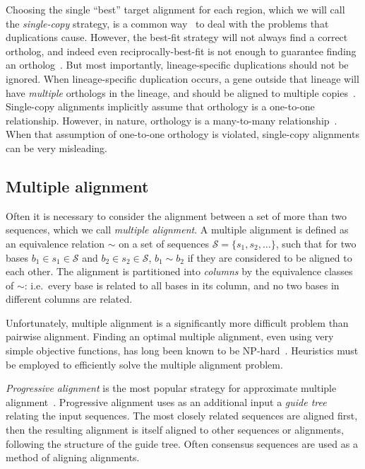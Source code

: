 \documentclass[fleqn,10pt]{wlscirep}
\begin{document}
Choosing the single ``best'' target alignment for each region, which we will call the \emph{single-copy} strategy, is a common way~\cite{blastz,tba} to deal with the problems that duplications cause.
However, the best-fit strategy will not always find a correct ortholog, and indeed even reciprocally-best-fit is not enough to guarantee finding an ortholog~\cite{recipBestOrtholog}.
But most importantly, lineage-specific duplications should not be ignored.
When lineage-specific duplication occurs, a gene outside that lineage will have \emph{multiple} orthologs in the lineage, and should be aligned to multiple copies~\cite{Koonin2005}.
Single-copy alignments implicitly assume that orthology is a one-to-one relationship.
However, in nature, orthology is a many-to-many relationship~\cite{Koonin2005}.
When that assumption of one-to-one orthology is violated, single-copy alignments can be very misleading.
\subsection*{Multiple alignment}
Often it is necessary to consider the alignment between a set of more than two sequences, which we call \emph{multiple alignment}.
A multiple alignment is defined as an equivalence relation $\sim$ on a set of sequences $\mathcal{S} = \{s_1, s_2, \ldots\}$, such that for two bases $b_1 \in s_1 \in \mathcal{S}$ and $b_2 \in s_2 \in \mathcal{S}$, $b_1 \sim b_2$ if they are considered to be aligned to each other.
The alignment is partitioned into \emph{columns} by the equivalence classes of $\sim$: i.e.\ every base is related to all bases in its column, and no two bases in different columns are related.

Unfortunately, multiple alignment is a significantly more difficult problem than pairwise alignment.
Finding an optimal multiple alignment, even using very simple objective functions, has long been known to be NP-hard~\cite{complexityOfMultipleAlignment}.
Heuristics must be employed to efficiently solve the multiple alignment problem.

\emph{Progressive alignment} is the most popular strategy for approximate multiple alignment~\cite{progressiveAlignment}.
Progressive alignment uses as an additional input a \emph{guide tree} relating the input sequences.
The most closely related sequences are aligned first, then the resulting alignment is itself aligned to other sequences or alignments, following the structure of the guide tree. Often consensus sequences are used as a method of aligning alignments.
\end{document}
